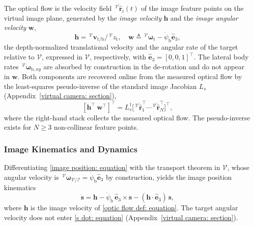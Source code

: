 \documentclass{IEEEtaes}
\begin{document}
The optical flow is the velocity field $\,^\mathcal{V}\dot{\hat{\boldsymbol{r}}}_i(t)$ of the image feature points on the virtual image plane, generated by the \emph{image velocity} $\boldsymbol{h}$ and the \emph{image angular velocity} $\boldsymbol{w}$,
\begin{equation} \label{optic flow def: equation}
    \boldsymbol{h} = \,^\mathcal{V}\boldsymbol{v}_{\text{t/b}}/\,^\mathcal{V}z_\text{t}, \quad \boldsymbol{w} \triangleq \,^\mathcal{V}\boldsymbol{\omega}_\text{t}-\dot{\psi}_\text{b}\hat{\boldsymbol{e}}_3,
\end{equation}
the depth-normalized translational velocity and the angular rate of the target relative to $\mathcal{V}$, expressed in $\mathcal{V}$, respectively, with $\hat{\boldsymbol{e}}_3=[0,0,1]^\top$. The lateral body rates $\,^\mathcal{V}\boldsymbol{\omega}_{\text{b},xy}$ are absorbed by construction in the de-rotation and do not appear in $\boldsymbol{w}$. Both components are recovered online from the measured optical flow by the least-squares pseudo-inverse of the standard image Jacobian $L_s$ (Appendix~\ref{virtual camera: section}),
\begin{equation} \label{optic flow inverse: equation}
    [\boldsymbol{h}^\top~\boldsymbol{w}^\top]^\top = L_s^\dagger\big[\,^\mathcal{V}\dot{\hat{\boldsymbol{r}}}_1^\top \cdots \,^\mathcal{V}\dot{\hat{\boldsymbol{r}}}_N^\top\big]^\top,
\end{equation}
where the right-hand stack collects the measured optical flow. The pseudo-inverse exists for $N\ge 3$ non-collinear feature points.

\subsubsection{Image Kinematics and Dynamics} \label{image kinematics: section}
Differentiating \eqref{image position: equation} with the transport theorem in $\mathcal{V}$, whose angular velocity is $\,^\mathcal{V}\boldsymbol{\omega}_{\mathcal{V}/\mathcal{I}}=\dot{\psi}_\text{b}\hat{\boldsymbol{e}}_3$ by construction, yields the image position kinematics
\begin{equation} \label{s dot: equation}
    \dot{\boldsymbol{s}} = \boldsymbol{h} - \dot{\psi}_\text{b}\,\hat{\boldsymbol{e}}_3\times\boldsymbol{s} - (\boldsymbol{h}\cdot\hat{\boldsymbol{e}}_3)\,\boldsymbol{s},
\end{equation}
where $\boldsymbol{h}$ is the image velocity of \eqref{optic flow def: equation}. The target angular velocity does not enter \eqref{s dot: equation} (Appendix~\ref{virtual camera: section}).
\end{document}
